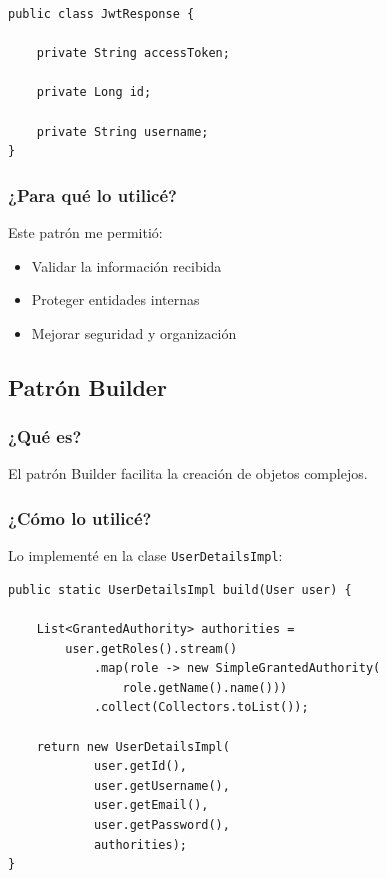 \documentclass[12pt,a4paper]{article}
\begin{document}
\begin{lstlisting}
public class JwtResponse {

    private String accessToken;

    private Long id;

    private String username;
}
\end{lstlisting}

\subsubsection{¿Para qué lo utilicé?}

Este patrón me permitió:

\begin{itemize}
    \item Validar la información recibida
    \item Proteger entidades internas
    \item Mejorar seguridad y organización
\end{itemize}

\subsection{Patrón Builder}

\subsubsection{¿Qué es?}

El patrón Builder facilita la creación de objetos complejos.

\subsubsection{¿Cómo lo utilicé?}

Lo implementé en la clase \texttt{UserDetailsImpl}:

\begin{lstlisting}
public static UserDetailsImpl build(User user) {

    List<GrantedAuthority> authorities =
        user.getRoles().stream()
            .map(role -> new SimpleGrantedAuthority(
                role.getName().name()))
            .collect(Collectors.toList());

    return new UserDetailsImpl(
            user.getId(),
            user.getUsername(),
            user.getEmail(),
            user.getPassword(),
            authorities);
}
\end{lstlisting}
\end{document}
